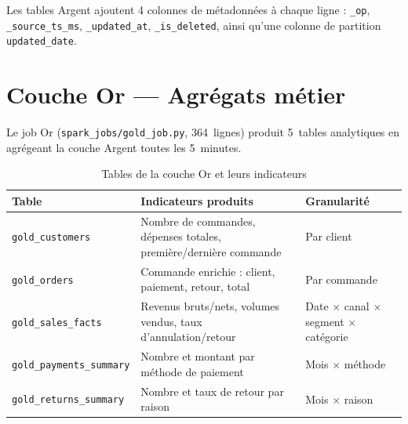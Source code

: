 \documentclass[12pt,a4paper]{report}
\begin{document}
Les tables Argent ajoutent 4 colonnes de métadonnées à chaque ligne :
\texttt{\_op}, \texttt{\_source\_ts\_ms}, \texttt{\_updated\_at},
\texttt{\_is\_deleted}, ainsi qu'une colonne de partition \texttt{updated\_date}.

\section{Couche Or --- Agrégats métier}

Le job Or (\texttt{spark\_jobs/gold\_job.py}, 364~lignes) produit
5~tables analytiques en agrégeant la couche Argent toutes les 5~minutes.

\begin{table}[h]
\centering
\caption{Tables de la couche Or et leurs indicateurs}
\label{tab:gold}
\renewcommand{\arraystretch}{1.3}
\begin{tabularx}{\linewidth}{lXl}
\toprule
\textbf{Table} & \textbf{Indicateurs produits} & \textbf{Granularité} \\
\midrule
\texttt{gold\_customers}
    & Nombre de commandes, dépenses totales, première/dernière commande
    & Par client \\
\texttt{gold\_orders}
    & Commande enrichie : client, paiement, retour, total
    & Par commande \\
\texttt{gold\_sales\_facts}
    & Revenus bruts/nets, volumes vendus, taux d'annulation/retour
    & Date $\times$ canal $\times$ segment $\times$ catégorie \\
\texttt{gold\_payments\_summary}
    & Nombre et montant par méthode de paiement
    & Mois $\times$ méthode \\
\texttt{gold\_returns\_summary}
    & Nombre et taux de retour par raison
    & Mois $\times$ raison \\
\bottomrule
\end{tabularx}
\end{table}
\end{document}
